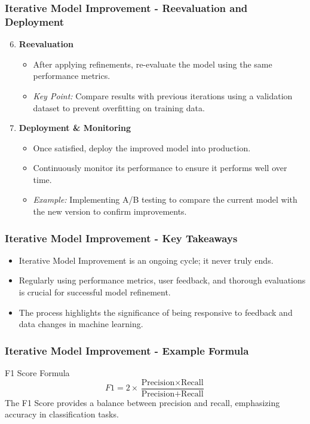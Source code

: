 \documentclass[aspectratio=169]{beamer}
\begin{document}
\begin{frame}[fragile]
    \frametitle{Iterative Model Improvement - Reevaluation and Deployment}
    \begin{enumerate}
        \setcounter{enumi}{5}
        \item \textbf{Reevaluation}
        \begin{itemize}
            \item After applying refinements, re-evaluate the model using the same performance metrics.
            \item \textit{Key Point:} Compare results with previous iterations using a validation dataset to prevent overfitting on training data.
        \end{itemize}

        \item \textbf{Deployment \& Monitoring}
        \begin{itemize}
            \item Once satisfied, deploy the improved model into production.
            \item Continuously monitor its performance to ensure it performs well over time.
            \item \textit{Example:} Implementing A/B testing to compare the current model with the new version to confirm improvements.
        \end{itemize}
    \end{enumerate}
\end{frame}

\begin{frame}[fragile]
    \frametitle{Iterative Model Improvement - Key Takeaways}
    \begin{itemize}
        \item Iterative Model Improvement is an ongoing cycle; it never truly ends.
        \item Regularly using performance metrics, user feedback, and thorough evaluations is crucial for successful model refinement.
        \item The process highlights the significance of being responsive to feedback and data changes in machine learning.
    \end{itemize}
\end{frame}

\begin{frame}[fragile]
    \frametitle{Iterative Model Improvement - Example Formula}
    \begin{block}{F1 Score Formula}
        \[
        F1 = 2 \times \frac{\text{Precision} \times \text{Recall}}{\text{Precision} + \text{Recall}}
        \]
        The F1 Score provides a balance between precision and recall, emphasizing accuracy in classification tasks.
    \end{block}
\end{frame}
\end{document}
